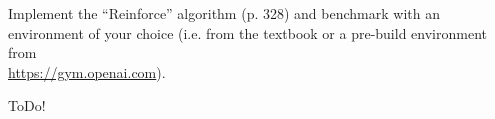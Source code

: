 
\begin{exercise}


Implement the \enquote{Reinforce} algorithm (p. 328) and benchmark with an environment of your choice (i.e. from the textbook or a pre-build environment from \\ \href{https://gym.openai.com}{https://gym.openai.com}).
\end{exercise}


\begin{solution}

ToDo!

\end{solution}

